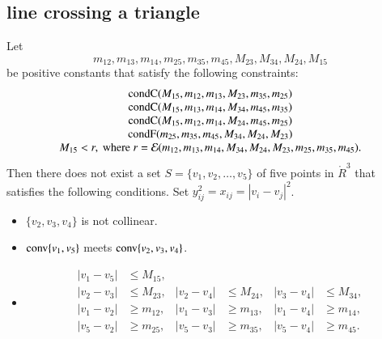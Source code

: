 \begin{tarskidata}
\begin{tarski}
\subsection{line crossing a triangle}

\begin{lemma}
Let $$m_{12},m_{13},m_{14},m_{25},m_{35},m_{45},M_{23},M_{34},M_{24},M_{15}$$ 
be positive constants that satisfy the following constraints:
	$$
	\begin{array}{clll}
	{\operatorname{condC}}(M_{15},m_{12},m_{13},M_{23},m_{35},m_{25})\\
	{\operatorname{condC}}(M_{15},m_{13},m_{14},M_{34},m_{45},m_{35})\\
	{\operatorname{condC}}(M_{15},m_{12},m_{14},M_{24},m_{45},m_{25})\\
	{\operatorname{condF}}(m_{25},m_{35},m_{45},M_{34},M_{24},M_{23})\\
	M_{15} < r, \text{ where } 
	r = {\mathcal E}(m_{12},m_{13},m_{14},M_{34},M_{24},M_{23},m_{25},m_{35},m_{45}).
	\end{array}
	$$
Then there does not exist a set $S=\{v_1,v_2,\ldots,v_5\}$ of five
points  in $\ring{R}^3$ that satisfies the following conditions.  
Set $y_{ij}^2 = x_{ij} = |v_i-v_j|^2$.
	\begin{itemize}
	\item $\{v_2,v_3,v_4\}$ is not collinear.
	\item ${\operatorname{conv}}\{v_1,v_5\}$ meets ${\operatorname{conv}}\{v_2,v_3,v_4\}$.
	\item 
		$$
		\begin{array}{rlrlrl}
		|v_1-v_5| &\le M_{15},\\
		|v_2-v_3| &\le M_{23}, &|v_2-v_4| &\le M_{24}, & |v_3-v_4|&\le M_{34},\\
		|v_1-v_2| &\ge m_{12},&|v_1-v_3| &\ge m_{13},& |v_1-v_4|&\ge m_{14},\\
		|v_5-v_2| &\ge m_{25},&|v_5-v_3| &\ge m_{35},& |v_5-v_4|&\ge m_{45}.\\
		\end{array}
		$$
	\end{itemize}
\end{lemma}




\end{tarski}
\end{tarskidata}
